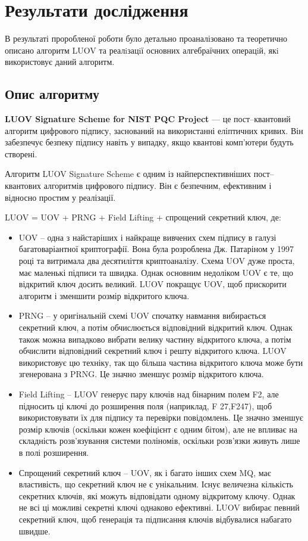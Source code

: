 
\section{Результати дослідження}
\label{chap:research_results} 

В результаті проробленої роботи було детально проаналізовано та теоретично описано алгоритм LUOV та реалiзацiї основних алгебраїчних операцiй, якi використовує даний алгоритм.

\subsection{Опис алгоритму}

\textbf{LUOV Signature Scheme for NIST PQC Project} --- це пост--квантовий алгоритм цифрового підпису, заснований на використанні еліптичних кривих. Він забезпечує безпеку підпису навіть у випадку, якщо квантові комп’ютери будуть створені.

Алгоритм LUOV Signature Scheme є одним із найперспективніших пост--квантових алгоритмів цифрового підпису. Він є безпечним, ефективним і відносно простим у реалізації.

LUOV = UOV + PRNG + Field Lifting + спрощений секретний ключ, де:
\begin{itemize}
    \item UOV -- одна з найстаріших і найкраще вивчених схем підпису в галузі багатоваріантної криптографії. Вона була розроблена Дж. Патаріном у 1997 році та витримала два десятиліття криптоаналізу. Схема UOV дуже проста, має маленькі підписи та швидка. Однак основним недоліком UOV є те, що відкритий ключ досить великий. LUOV покращує UOV, щоб прискорити алгоритм і зменшити розмір відкритого ключа.
    \item PRNG -- у оригінальній схемі UOV спочатку навмання вибирається секретний ключ, а потім обчислюється відповідний відкритий ключ. Однак також можна випадково вибрати велику частину відкритого ключа, а потім обчислити відповідний секретний ключ і решту відкритого ключа. LUOV використовує цю техніку, так що більша частина відкритого ключа може бути згенерована з PRNG. Це значно зменшує розмір відкритого ключа.
    \item Field Lifting -- LUOV генерує пару ключів над бінарним полем F2, але підносить ці ключі до розширення поля (наприклад, F 27,F247), щоб використовувати їх для підпису та перевірки повідомлень. Це значно зменшує розмір ключів (оскільки кожен коефіцієнт є одним бітом), але не впливає на складність розв’язування системи поліномів, оскільки розв’язки живуть лише в полі розширення.
    \item Спрощений секретний ключ -- UOV, як і багато інших схем MQ, має властивість, що секретний ключ не є унікальним. Існує величезна кількість секретних ключів, які можуть відповідати одному відкритому ключу. Однак не всі ці можливі секретні ключі однаково ефективні. LUOV вибирає певний секретний ключ, щоб генерація та підписання ключів відбувалися набагато швидше.
\end{itemize}

